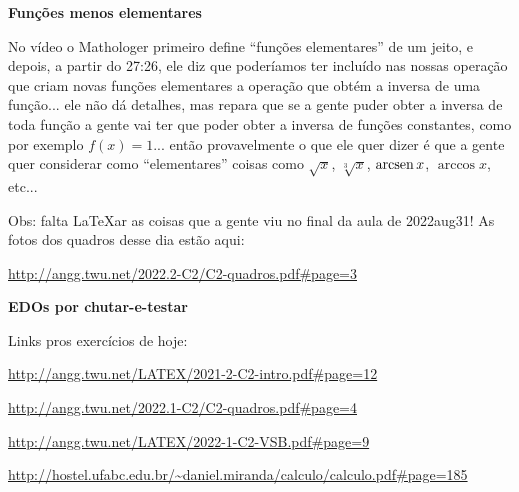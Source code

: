 \documentclass[oneside,12pt]{article}
\begin{document}
{\bf Funções menos elementares}

No vídeo o Mathologer primeiro define ``funções elementares'' de um
jeito, e depois, a partir do 27:26, ele diz que poderíamos ter
incluído nas nossas operação que criam novas funções elementares a
operação que obtém a inversa de uma função... ele não dá detalhes, mas
repara que se a gente puder obter a inversa de toda função a gente vai
ter que poder obter a inversa de funções constantes, como por exemplo
$f(x)=1$... então provavelmente o que ele quer dizer é que a gente
quer considerar como ``elementares'' coisas como $\sqrt{x}$,
$\sqrt[3]{x}$, $\operatorname{arcsen} x$, $\arccos x$, etc...

\bsk

Obs: falta \LaTeX ar as coisas que a gente viu no final da aula de
2022aug31! As fotos dos quadros desse dia estão aqui:

\url{http://angg.twu.net/2022.2-C2/C2-quadros.pdf\#page=3}


\newpage


{\bf EDOs por chutar-e-testar}

Links pros exercícios de hoje:

\ssk

{\footnotesize

\url{http://angg.twu.net/LATEX/2021-2-C2-intro.pdf#page=12}

\url{http://angg.twu.net/2022.1-C2/C2-quadros.pdf\#page=4}

\url{http://angg.twu.net/LATEX/2022-1-C2-VSB.pdf\#page=9}

\url{http://hostel.ufabc.edu.br/~daniel.miranda/calculo/calculo.pdf\#page=185}

}
\end{document}
